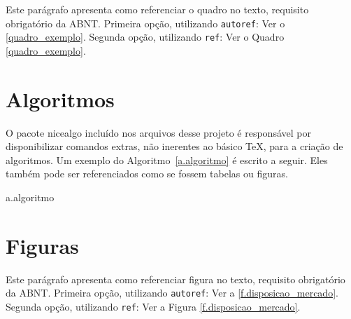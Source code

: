Este parágrafo apresenta como referenciar o quadro no texto, requisito
obrigatório da ABNT. 
Primeira opção, utilizando \texttt{autoref}: Ver o \autoref{quadro_exemplo}. 
Segunda opção, utilizando  \texttt{ref}: Ver o Quadro \ref{quadro_exemplo}.



\section{Algoritmos}
\label{s.algoritmos}

O pacote nicealgo incluído nos arquivos desse projeto é responsável por disponibilizar comandos extras, não inerentes ao básico TeX, para a criação de algoritmos. Um exemplo do Algoritmo~\ref{a.algoritmo} é escrito a seguir. Eles também pode ser referenciados como se fossem tabelas ou figuras.

\begin{nicealgo}{a.algoritmo}
\naPREAMBLE
{}
\naBODY
{}
\naEND{}
\naEND{}
\naEND{}
\naEND{}
\naEND{}
\end{nicealgo}

\section{Figuras}
\label{s.figuras}

Este parágrafo apresenta como referenciar figura no texto, requisito obrigatório da ABNT.
Primeira opção, utilizando \texttt{autoref}: Ver a \autoref{f.disposicao_mercado}. 
Segunda opção, utilizando  \texttt{ref}: Ver a Figura \ref{f.disposicao_mercado}.

